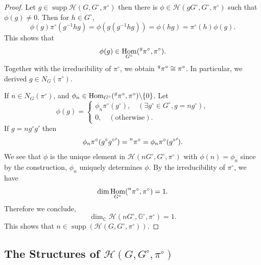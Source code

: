 \documentclass[8pt]{article}
\DeclareMathOperator{\Hom}{Hom}
\DeclareMathOperator{\supp}{supp}
\newcommand{\C}[0]{\mathbb{C}}
\newcommand{\G}[0]{\mathbb{G}}
\newcommand{\hecke}[0]{\mathscr{H}}
\begin{document}
\begin{proof}
  Let $g\in\supp\hecke(G,G^\circ,\pi^\circ)$ then there is $\phi\in\hecke(gG^\circ,G^\circ,\pi^\circ)$ such that $\phi(g) \not=0$. Then for $h\in G^\circ$, 
  \begin{equation*}
    \phi(g)\pi^\circ(g^{-1}hg) = \phi(g(g^{-1}hg)) = \phi(hg) = \pi^\circ(h)\phi(g).
  \end{equation*}
  This shows that 
  \begin{equation*}
    \phi(g)\in\Hom_{G^\circ}(\prescript{g}{}{\pi^\circ},\pi^\circ).
  \end{equation*}
  Together with the irreducibility of $\pi^\circ$, we obtain $\prescript{g}{}{\pi^\circ}\cong\pi^\circ$. In particular, we derived $g\in N_G(\pi^\circ)$.
  \par If $n\in N_{G}(\pi^\circ)$, and $\phi_n\in\Hom_{G^\circ}(\prescript{g}{}{\pi^\circ},\pi^\circ)\backslash\{0\}$. Let 
  \begin{equation*}
    \phi(g) = \begin{cases}
      \phi_n\pi^\circ(g^\circ),\quad(\exists g^\circ\in G^\circ, g = ng^\circ),\\
      0,\quad(\text{otherwise}).
    \end{cases}
  \end{equation*}
  If $g = ng^\circ g'$ then 
  \begin{equation*}
    \phi_n\pi^\circ(g^\circ {g^\circ}') = \prescript{n}{}{\pi^\circ}=\phi_n\pi^\circ({g^\circ}').
  \end{equation*}
  We see that $\phi$ is the unique element in $\hecke(nG^\circ,G^\circ,\pi^\circ)$ with $\phi(n) = \phi_n$ since by the construction, $\phi_n$ uniquely determines $\phi$. By the irreducibility of $\pi^\circ$, we have 
  \begin{equation*}
    \dim\Hom_{G^\circ}(\prescript{n}{}{\pi^\circ},\pi^\circ)=1. 
  \end{equation*}
  Therefore we conclude,
  \begin{equation*}
    \dim_\C\hecke(nG^\circ,\G^\circ,\pi^\circ) = 1. 
  \end{equation*}
  This shows that $n\in\supp(\hecke(G,G^\circ,\pi^\circ))$. 
\end{proof}
\subsection{The Structures of $\hecke(G,G^\circ,\pi^\circ)$}

\end{document}
